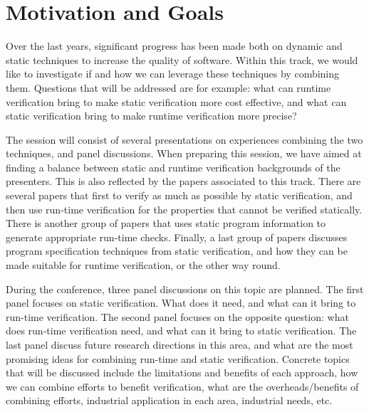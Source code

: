 
\section{Motivation and Goals}

Over the last years, significant progress has been made both on dynamic and static techniques to increase the quality of software. Within this track, we would like to investigate if and how we can leverage these techniques by combining them. Questions that will be addressed are for example: what can runtime verification bring to make static verification more cost effective, and what can static verification bring to make runtime verification more precise? 

The session will consist of several presentations on experiences combining the two techniques, and panel discussions. When preparing this session, we have aimed at finding a balance between static and runtime verification backgrounds of the presenters. This is also reflected by the papers associated to this track. There are several papers that first to verify as much as possible by static verification, and then use run-time verification for the properties that cannot be verified statically. There is another group of papers that uses static program information to generate appropriate run-time checks. Finally, a last group of papers discusses program specification techniques from static verification, and how they can be made suitable for runtime verification, or the other way round.

During the conference, three panel discussions on this topic are planned. The first panel focuses on static verification. What does it need, and what can it bring to run-time verification. The second panel focuses on the opposite question: what does run-time verification need, and what can it bring to static verification. The last panel  discuss future research directions in this area, and what are the most promising ideas for combining run-time and static verification. Concrete topics that will be discussed include the limitations and benefits of each approach, how we can combine efforts to benefit verification, what are the overheads/benefits of combining efforts, industrial application in each area, industrial needs, etc.



